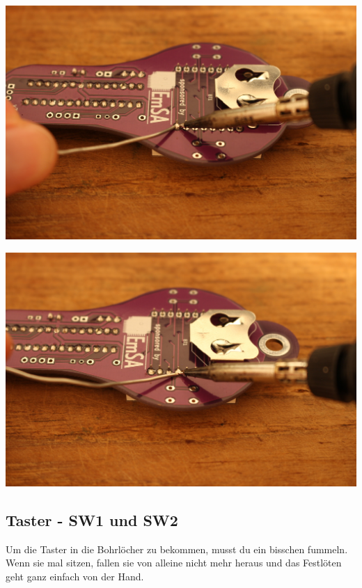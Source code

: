 \documentclass{article}
\begin{document}
\begin{minipage}[b]{0.5\textwidth}
	\includegraphics[width=\textwidth]{Bilder2024/IMG_0064.JPG}
\end{minipage}
\begin{minipage}[b]{0.5\textwidth}
	\includegraphics[width=\textwidth]{Bilder2024/IMG_0065.JPG}
\end{minipage}

\subsection{Taster - SW1 und SW2}

Um die Taster in die Bohrlöcher zu bekommen, musst du ein bisschen fummeln. Wenn sie mal sitzen, fallen sie von alleine nicht mehr heraus und das Festlöten geht ganz einfach von der Hand.
\end{document}
